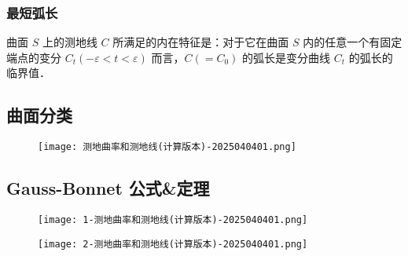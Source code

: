 \subsubsection{最短弧长}

曲面 $S$ 上的测地线 $C$ 所满足的内在特征是：对于它在曲面 $S$ 内的任意一个有固定端点的变分 $C_t(-\varepsilon<t<\varepsilon)$ 而言，$C\left(=C_0\right)$ 的弧长是变分曲线 $C_t$ 的弧长的临界值．

\subsection{曲面分类}

\begin{figure}[H]
\centering
\texttt{[image: 测地曲率和测地线(计算版本)-2025040401.png]}
\label{}
\end{figure}

\subsection{Gauss-Bonnet 公式\&定理}

\begin{figure}[H]
\centering
\texttt{[image: 1-测地曲率和测地线(计算版本)-2025040401.png]}
\label{}
\end{figure}
\begin{figure}[H]
\centering
\texttt{[image: 2-测地曲率和测地线(计算版本)-2025040401.png]}
\label{}
\end{figure}

